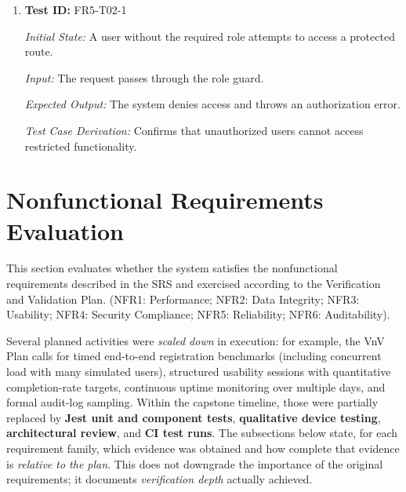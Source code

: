 \documentclass[12pt, titlepage]{article}
\begin{document}
\begin{enumerate}

\item \textbf{Test ID:} FR5-T02-1

\textit{Initial State:} A user without the required role attempts to access a protected route.

\textit{Input:} The request passes through the role guard.

\textit{Expected Output:} The system denies access and throws an authorization error.

\textit{Test Case Derivation:} Confirms that unauthorized users cannot access restricted functionality.

\end{enumerate}

\section{Nonfunctional Requirements Evaluation}
\label{sec:nonfunctional}

This section evaluates whether the system satisfies the nonfunctional requirements described in the SRS and exercised according to the Verification and Validation Plan. (NFR1: Performance; NFR2: Data Integrity; NFR3: Usability; NFR4: Security Compliance; NFR5: Reliability; NFR6: Auditability).

Several planned activities were \emph{scaled down} in execution: for example, the VnV Plan calls for timed end-to-end registration benchmarks (including concurrent load with many simulated users), structured usability sessions with quantitative completion-rate targets, continuous uptime monitoring over multiple days, and formal audit-log sampling. Within the capstone timeline, those were partially replaced by \textbf{Jest unit and component tests}, \textbf{qualitative device testing}, \textbf{architectural review}, and \textbf{CI test runs}. The subsections below state, for each requirement family, which evidence was obtained and how complete that evidence is \emph{relative to the plan}. This does not downgrade the importance of the original requirements; it documents \emph{verification depth} actually achieved.
\end{document}
